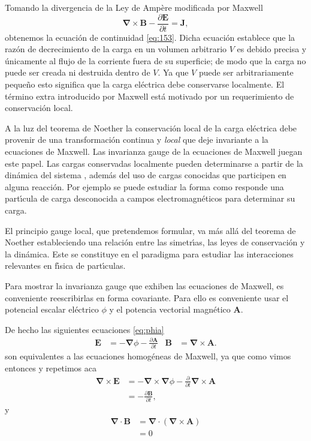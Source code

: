 Tomando la divergencia de la Ley de Amp\`ere modificada por Maxwell
\begin{equation}
   \boldsymbol{\nabla}\times\mathbf{B}-\frac{\partial\mathbf{E}}{\partial t}=\mathbf{J},
\end{equation}
obtenemos la ecuaci\'on de continuidad \eqref{eq:153}. Dicha ecuaci\'on establece que la raz\'on de decrecimiento de la carga en un volumen arbitrario $V$ es debido precisa y \'unicamente al flujo de la corriente fuera de su superficie; de modo que la carga no puede ser creada ni destruida dentro de $V$.  Ya que $V$ puede ser arbitrariamente peque\~no esto significa que la carga el\'ectrica debe conservarse localmente.   El t\'ermino extra introducido por Maxwell est\'a motivado por un requerimiento de conservaci\'on local. 



A la luz del teorema de Noether la conservaci\'on local de la carga el\'ectrica debe provenir de una transformaci\'on continua y \emph{local} que deje invariante a la ecuaciones de Maxwell. Las invarianza gauge de la ecuaciones de Maxwell juegan este papel. Las cargas conservadas localmente pueden determinarse a partir de la din\'amica del sistema  \cite{Aitchison:2003tq}, adem\'as del uso de cargas conocidas que participen en alguna reacci\'on. Por ejemplo se puede estudiar la forma como responde una part\'\i cula de carga desconocida a campos electromagn\'eticos para determinar su carga. 

El principio gauge local, que pretendemos formular, va m\'as all\'a del teorema de Noether estableciendo una relaci\'on entre las simetr\'\i as, las leyes de conservaci\'on y la din\'amica. Este se constituye en el paradigma para estudiar las interacciones relevantes en f\'\i sica de part\'\i culas.

Para mostrar la invarianza gauge que exhiben las ecuaciones de Maxwell, es conveniente reescribirlas en forma covariante. Para ello es conveniente usar el potencial escalar el\'ectrico $\phi$ y el potencia vectorial magn\'etico $\mathbf{A}$.

De hecho las siguientes ecuaciones \eqref{eq:phia}
\begin{align}
  \label{eq:phia}
  \mathbf{E}&=-\boldsymbol{\nabla}\phi-\frac{\partial\mathbf{A}}{\partial t}&
  \mathbf{B}&=\boldsymbol{\nabla}\times\mathbf{A}.
\end{align}
 son equivalentes a las ecuaciones homog\'eneas de Maxwell, ya que como vimos entonces y repetimos aca
\begin{align*}
  \boldsymbol{\nabla}\times\mathbf{E}&=-\boldsymbol{\nabla}\times\boldsymbol{\nabla}\phi-\frac{\partial}{\partial t}\boldsymbol{\nabla}\times\mathbf{A}\\
  &=-\frac{\partial\mathbf{B}}{\partial t},
\end{align*}
y
\begin{align*}
  \boldsymbol{\nabla}\cdot\mathbf{B}&=\boldsymbol{\nabla}\cdot(\boldsymbol{\nabla}\times\mathbf{A})\\
  &=0
\end{align*}






